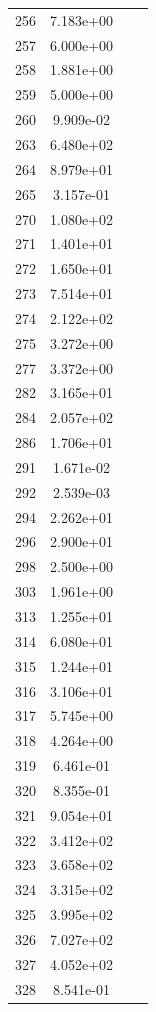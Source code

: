 \documentclass[12pt]{article}
\begin{document}
\begin{longtable}{@{}cccc@{}}
256 & 7.183e+00 &  &  \\
257 & 6.000e+00 &  &  \\
258 & 1.881e+00 &  &  \\
259 & 5.000e+00 &  &  \\
260 & 9.909e-02 &  &  \\
263 & 6.480e+02 &  &  \\
264 & 8.979e+01 &  &  \\
265 & 3.157e-01 &  &  \\
270 & 1.080e+02 &  &  \\
271 & 1.401e+01 &  &  \\
272 & 1.650e+01 &  &  \\
273 & 7.514e+01 &  &  \\
274 & 2.122e+02 &  &  \\
275 & 3.272e+00 &  &  \\
277 & 3.372e+00 &  &  \\
282 & 3.165e+01 &  &  \\
284 & 2.057e+02 &  &  \\
286 & 1.706e+01 &  &  \\
291 & 1.671e-02 &  &  \\
292 & 2.539e-03 &  &  \\
294 & 2.262e+01 &  &  \\
296 & 2.900e+01 &  &  \\
298 & 2.500e+00 &  &  \\
303 & 1.961e+00 &  &  \\
313 & 1.255e+01 &  &  \\
314 & 6.080e+01 &  &  \\
315 & 1.244e+01 &  &  \\
316 & 3.106e+01 &  &  \\
317 & 5.745e+00 &  &  \\
318 & 4.264e+00 &  &  \\
319 & 6.461e-01 &  &  \\
320 & 8.355e-01 &  &  \\
321 & 9.054e+01 &  &  \\
322 & 3.412e+02 &  &  \\
323 & 3.658e+02 &  &  \\
324 & 3.315e+02 &  &  \\
325 & 3.995e+02 &  &  \\
326 & 7.027e+02 &  &  \\
327 & 4.052e+02 &  &  \\
328 & 8.541e-01 &  &  \\

\end{longtable}
\end{document}
